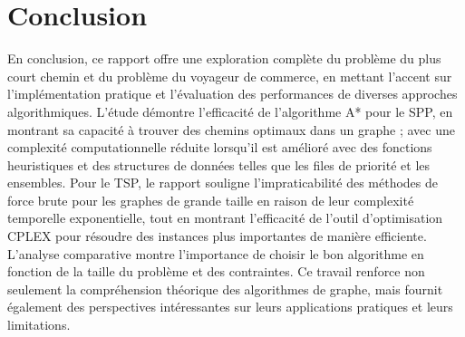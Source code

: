 \chapter{Conclusion}
\label{chap:conclusion}
En conclusion, ce rapport offre une exploration complète du problème du plus court chemin et du problème du voyageur de commerce, en mettant l'accent sur l'implémentation pratique et l'évaluation des performances de diverses approches algorithmiques. L'étude démontre l'efficacité de l'algorithme A* pour le \ac{SPP}, en montrant sa capacité à trouver des chemins optimaux dans un graphe ; avec une complexité computationnelle réduite lorsqu'il est amélioré avec des fonctions heuristiques et des structures de données telles que les files de priorité et les ensembles. Pour le \ac{TSP}, le rapport souligne l'impraticabilité des méthodes de force brute pour les graphes de grande taille en raison de leur complexité temporelle exponentielle, tout en montrant l'efficacité de l'outil d'optimisation CPLEX pour résoudre des instances plus importantes de manière efficiente. L'analyse comparative montre l'importance de choisir le bon algorithme en fonction de la taille du problème et des contraintes. Ce travail renforce non seulement la compréhension théorique des algorithmes de graphe, mais fournit également des perspectives intéressantes sur leurs applications pratiques et leurs limitations.
